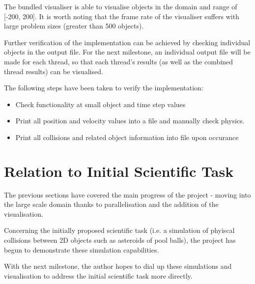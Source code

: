 \documentclass[twoside,twocolumn]{article}
\begin{document}
	The bundled visualiser is able to visualise objects in the domain and range of [-200, 200]. It is worth noting that the frame rate of the visualiser suffers with large problem sizes (greater than 500 objects). \newline
	
	Further verification of the implementation can be achieved by checking individual objects in the output file. For the next milestone, an individual output file will be made for each thread, so that each thread's results (as well as the combined thread results) can be visualised. \newline
	
	The following steps have been taken to verify the implementation: \newline
	
	\begin{itemize}
		\item Check functionality at small object and time step values
		\item Print all position and velocity values into a file and manually check physics.
		\item Print all collisions and related object information into file upon occurance
	\end{itemize}
	
	
	\section{Relation to Initial Scientific Task}
	
	The previous sections have covered the main progress of the project - moving into the large scale domain thanks to parallelisation and 
	the addition of the visualisation. \newline
	
	Concerning the initially proposed scientific task (i.e. a simulation of phyiscal collisions between 2D objects such as asteroids of pool balls), the project has begun to demonstrate these simulation capabilities. \newline
	
	With the next milestone, the author hopes to dial up these simulations and visualisation to address the initial scientific task more directly. 
	
	
	
\end{document}
